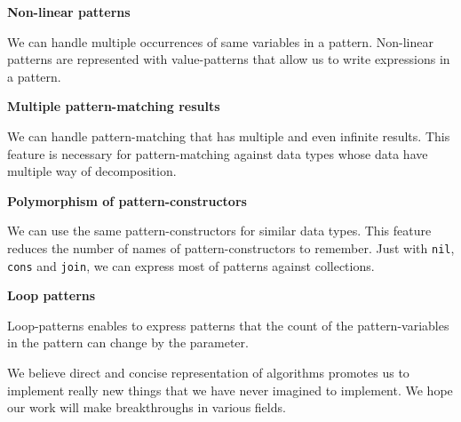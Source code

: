 \documentclass{article}
\begin{document}
\begin{description}
  \item \textbf{Non-linear patterns}

    We can handle multiple occurrences of same variables in a pattern.
    Non-linear patterns are represented with value-patterns that allow us to write expressions in a pattern.

  \item \textbf{Multiple pattern-matching results}

    We can handle pattern-matching that has multiple and even infinite results.
    This feature is necessary for pattern-matching against data types whose data have multiple way of decomposition.

  \item \textbf{Polymorphism of pattern-constructors}

    We can use the same pattern-constructors for similar data types.
    This feature reduces the number of names of pattern-constructors to remember.
    Just with \texttt{nil}, \texttt{cons} and \texttt{join}, we can express most of patterns against collections.

  \item \textbf{Loop patterns}

    Loop-patterns enables to express patterns that the count of the pattern-variables in the pattern can change by the parameter.

\end{description}

We believe direct and concise representation of algorithms promotes us to implement really new things that we have never imagined to implement.
We hope our work will make breakthroughs in various fields.



\end{document}
